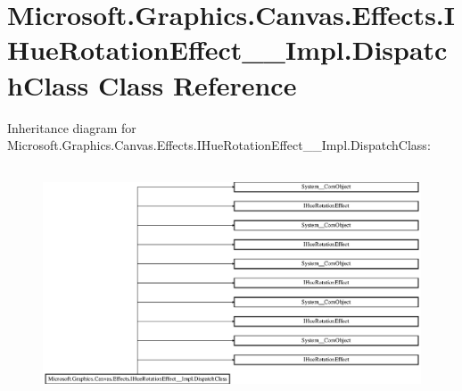 \hypertarget{class_microsoft_1_1_graphics_1_1_canvas_1_1_effects_1_1_i_hue_rotation_effect_____impl_1_1_dispatch_class}{}\section{Microsoft.\+Graphics.\+Canvas.\+Effects.\+I\+Hue\+Rotation\+Effect\+\_\+\+\_\+\+Impl.\+Dispatch\+Class Class Reference}
\label{class_microsoft_1_1_graphics_1_1_canvas_1_1_effects_1_1_i_hue_rotation_effect_____impl_1_1_dispatch_class}
Inheritance diagram for Microsoft.\+Graphics.\+Canvas.\+Effects.\+I\+Hue\+Rotation\+Effect\+\_\+\+\_\+\+Impl.\+Dispatch\+Class\+:\begin{figure}[H]
\begin{center}
\leavevmode
\includegraphics[height=6.905830cm]{class_microsoft_1_1_graphics_1_1_canvas_1_1_effects_1_1_i_hue_rotation_effect_____impl_1_1_dispatch_class}
\end{center}
\end{figure}
